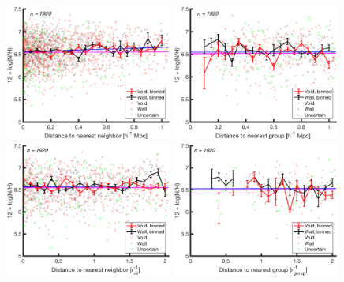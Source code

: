 \begin{figure}
    \includegraphics[width=0.49\textwidth]{Images/smallScaleEnvironment/1sig_dwarf_I06relations_absDist_NH}
    \includegraphics[width=0.49\textwidth]{Images/smallScaleEnvironment/1sig_dwarf_I06relations_groupAbsDist_NH}
    \includegraphics[width=0.49\textwidth]{Images/smallScaleEnvironment/1sig_dwarf_I06relations_virDist_NH}
    \includegraphics[width=0.49\textwidth]{Images/smallScaleEnvironment/1sig_dwarf_I06relations_groupRDist_NH}

\end{figure}
